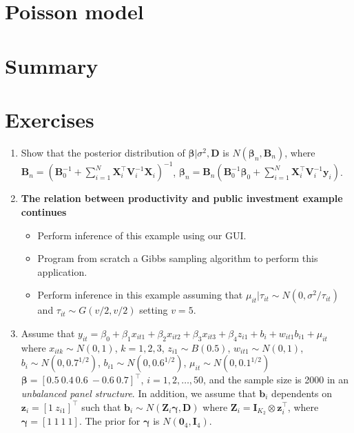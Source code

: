 \section{Poisson model}\label{sec93}

\section{Summary}\label{sec94}

\section{Exercises}\label{sec95}

\begin{enumerate}
	
	\item Show that the posterior distribution of $\bm{\beta}|\sigma^2,\bm{D}$ is $N(\bm{\beta}_n,\bm{B}_n)$, where $\bm{B}_n = (\bm{B}_0^{-1} +\sum_{i=1}^N \bm{X}_i^{\top}\bm{V}_i^{-1}\bm{X}_i)^{-1}$, $\bm{\beta}_n= \bm{B}_n(\bm{B}_0^{-1}\bm{\beta}_0 + \sum_{i=1}^N\bm{X}_i^{\top}\bm{V}_i^{-1}\bm{y}_i)$.
	
	\item \textbf{The relation between productivity and public investment example continues}
	
	\begin{itemize}
		\item Perform inference of this example using our GUI.
		\item Program from scratch a Gibbs sampling algorithm to perform this application.
		\item Perform inference in this example assuming that $\mu_{it}|\tau_{it}\sim N(0, \sigma^2/\tau_{it})$ and $\tau_{it}\sim G(v/2,v/2)$ setting $v=5$. 
	\end{itemize}
  
	\item Assume that $y_{it}=\beta_0+\beta_1x_{it1}+\beta_2x_{it2}+\beta_3x_{it3}+\beta_4 z_{i1}+b_i+w_{it1}b_{i1}+\mu_{it}$ where $x_{itk}\sim N(0,1)$, $k=1,2,3$, $z_{i1}\sim B(0.5)$, $w_{it1}\sim N(0,1)$, $b_i\sim N(0, 0.7^{1/2})$, $b_{i1}\sim N(0, 0.6^{1/2})$, $\mu_{it}\sim N(0, 0.1^{1/2})$ $\bm{\beta}=[0.5 \ 0.4 \ 0.6 \ -0.6 \ 0.7]^{\top}$, $i=1,2,\dots,50$, and the sample size is 2000 in an \textit{unbalanced panel structure}. In addition, we assume that $\bm{b}_i$ dependents on $\bm{z}_i=[1 \ z_{i1}]^{\top}$ such that $\bm{b}_i\sim N(\bm{Z}_i\bm{\gamma},\bm{D})$ where $\bm{Z}_i=\bm{I}_{K_2}\otimes \bm{z}_i^{\top}$, where $\bm{\gamma}=[1 \ 1 \ 1 \ 1]$. The prior for $\bm{\gamma}$ is $N(\bm{0}_4,\bm{I}_4)$.
	

\end{enumerate}
